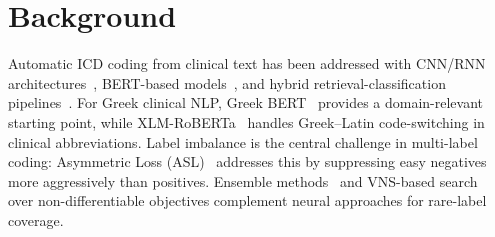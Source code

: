 \section{Background}
\label{sec:background}

Automatic ICD coding from clinical text has been addressed with CNN/RNN architectures~\cite{grbert_doc_pooling}, BERT-based models~\cite{devlin2019bert,lee2020biobert}, and hybrid retrieval-classification pipelines~\cite{dong2022automated}. For Greek clinical NLP, Greek BERT~\cite{koutsikakis2020greekbert} provides a domain-relevant starting point, while XLM-RoBERTa~\cite{conneau2020unsupervised} handles Greek--Latin code-switching in clinical abbreviations. Label imbalance is the central challenge in multi-label coding: Asymmetric Loss (ASL)~\cite{ridnik2021asl} addresses this by suppressing easy negatives more aggressively than positives. Ensemble methods~\cite{dietterich2000ensemble} and VNS-based search~\cite{mladenovic1997variable} over non-differentiable objectives complement neural approaches for rare-label coverage.
